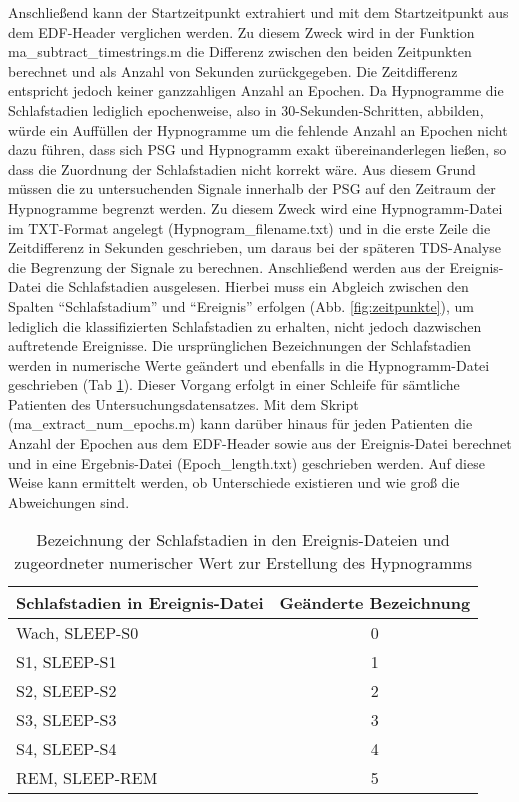 Anschließend kann der Startzeitpunkt extrahiert und mit dem Startzeitpunkt aus dem \acs{EDF}-Header verglichen werden. Zu diesem Zweck wird in der Funktion ma\_subtract\_timestrings.m die Differenz zwischen den beiden Zeitpunkten berechnet und als Anzahl von Sekunden zurückgegeben. Die Zeitdifferenz entspricht jedoch keiner ganzzahligen Anzahl an Epochen. Da Hypnogramme die Schlafstadien lediglich epochenweise, also in 30-Sekunden-Schritten, abbilden, würde ein Auffüllen der Hypnogramme um die fehlende Anzahl an Epochen nicht dazu führen, dass sich \acs{PSG} und Hypnogramm exakt übereinanderlegen ließen, so dass die Zuordnung der Schlafstadien nicht korrekt wäre. Aus diesem Grund müssen die zu untersuchenden Signale innerhalb der \acs{PSG} auf den Zeitraum der Hypnogramme begrenzt werden. Zu diesem Zweck wird eine Hypnogramm-Datei im TXT-Format angelegt (Hypnogram\_filename.txt) und in die erste Zeile die Zeitdifferenz in Sekunden geschrieben, um daraus bei der späteren \acs{TDS}-Analyse die Begrenzung der Signale zu berechnen. Anschließend werden aus der Ereignis-Datei die Schlafstadien ausgelesen. Hierbei muss ein Abgleich zwischen den Spalten "`Schlafstadium"' und "`Ereignis"' erfolgen (Abb. \ref{fig:zeitpunkte}), um lediglich die klassifizierten Schlafstadien zu erhalten, nicht jedoch dazwischen auftretende Ereignisse. Die ursprünglichen Bezeichnungen der Schlafstadien werden in numerische Werte geändert und ebenfalls in die Hypnogramm-Datei geschrieben (Tab \ref{tab:schlafstadien}). Dieser Vorgang erfolgt in einer Schleife für sämtliche Patienten des Untersuchungsdatensatzes. Mit dem Skript (ma\_extract\_num\_epochs.m) kann darüber hinaus für jeden Patienten die Anzahl der Epochen aus dem \acs{EDF}-Header sowie aus der Ereignis-Datei berechnet und in eine Ergebnis-Datei (Epoch\_length.txt) geschrieben werden. Auf diese Weise kann ermittelt werden, ob Unterschiede existieren und wie groß die Abweichungen sind.

\begin{table}[H] 
\centering
\begin{tabularx}{0.785\textwidth}{Xc}
\toprule
\multicolumn{1}{l}{\textbf{Schlafstadien in Ereignis-Datei}} & \multicolumn{1}{c}{\textbf{Geänderte Bezeichnung}}\\
\midrule 
Wach, SLEEP-S0 & 0\\
S1, SLEEP-S1 & 1\\
S2, SLEEP-S2 & 2\\
S3, SLEEP-S3 & 3\\
S4, SLEEP-S4 & 4\\
REM, SLEEP-REM & 5\\
\bottomrule
\end{tabularx}
\caption[Bezeichnung der Schlafstadien]{Bezeichnung der Schlafstadien in den Ereignis-Dateien und zugeordneter numerischer Wert zur Erstellung des Hypnogramms}
\label{tab:schlafstadien}
\end{table}
 
